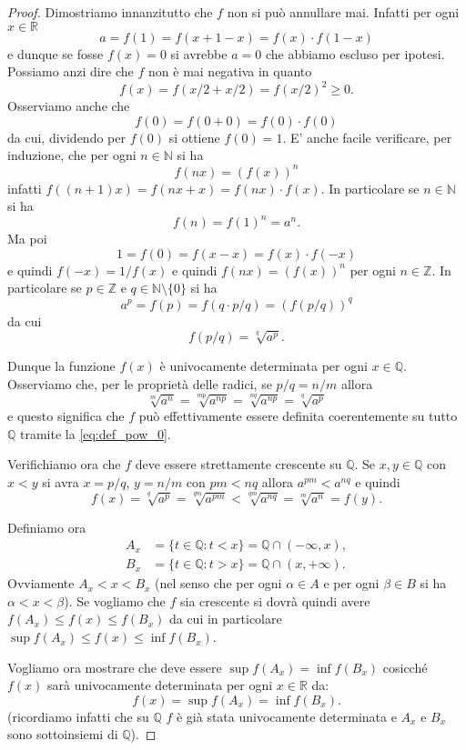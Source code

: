 \documentclass[italian,a4paper,oneside,headinclude]{scrbook}
\newcommand{\NN}{\mathbb N}
\newcommand{\QQ}{\mathbb Q}
\newcommand{\RR}{\mathbb R}
\newcommand{\ZZ}{\mathbb Z}
\begin{document}
\begin{proof}
Dimostriamo innanzitutto che $f$ non si può annullare mai.
Infatti per ogni $x\in \RR$
\[
   a = f(1) = f(x+1-x) = f(x)\cdot f(1-x)
\]
e dunque se fosse $f(x)=0$ si avrebbe $a=0$ che abbiamo escluso per ipotesi.
Possiamo anzi dire che $f$ non è mai negativa in quanto
\[
  f(x) = f(x/2 + x/2) = f(x/2)^2 \ge 0.
\]
Osserviamo anche che
\[
  f(0) = f(0+0) = f(0)\cdot f(0)
\]
da cui, dividendo per $f(0)$ si ottiene $f(0)=1$.
E' anche facile verificare, per induzione, che
per ogni $n\in \NN$ si ha
\[
 f(nx) = (f(x))^n
\]
infatti $f((n+1)x) = f(nx+x)=f(nx)\cdot f(x)$.
In particolare se $n\in \NN$ si ha
\[
  f(n) = f(1)^n = a^n.
\]
Ma poi
\[
1=f(0) = f(x-x) = f(x)\cdot f(-x)
\]
e quindi $f(-x)=1/f(x)$ e quindi $f(nx) = (f(x))^n$ per ogni $n\in \ZZ$.
In particolare se $p\in \ZZ$ e $q \in \NN\setminus\{0\}$ si ha
\[
 a^p = f(p) = f(q\cdot p/q) = (f(p/q))^q
\]
da cui
\begin{equation}\label{eq:def_pow_0}
 f(p/q) = \sqrt[q]{a^p}.
\end{equation}

Dunque la funzione $f(x)$ è univocamente determinata per ogni $x\in \QQ$.
Osserviamo che, per le proprietà delle radici, se $p/q = n/m$ allora
\[
 \sqrt[m]{a^n}
 = \sqrt[mp]{a^{np}}
 = \sqrt[nq]{a^{np}}
 = \sqrt[q]{a^p}
\]
e questo significa che $f$ può effettivamente essere definita
coerentemente su tutto $\QQ$
tramite
la \eqref{eq:def_pow_0}.

Verifichiamo ora che $f$ deve essere strettamente crescente su $\QQ$.
Se $x,y \in \QQ$
con $x<y$ si avra $x=p/q$, $y=n/m$ con $pm < nq$ allora
$a^{pm} < a^{nq}$ e quindi
\[
f(x)
= \sqrt[q]{a^p}
= \sqrt[qm]{a^{pm}}
< \sqrt[qm]{a^{nq}}
= \sqrt[m]{a^n}
= f(y).
\]

Definiamo ora
\begin{align*}
  A_x &= \{t\in \QQ\colon t<x\} = \QQ \cap (-\infty,x),
  \\
  B_x &= \{t\in \QQ\colon t>x\} = \QQ \cap (x,+\infty).
\end{align*}
Ovviamente $A_x < x < B_x$ (nel senso che per ogni $\alpha \in A$
e per ogni $\beta \in B$ si ha $\alpha < x < \beta$).
Se vogliamo che $f$ sia crescente si dovrà quindi avere
$f(A_x) \le f(x) \le f(B_x)$ da cui in particolare
$\sup f(A_x) \le f(x) \le \inf f(B_x)$.

Vogliamo ora mostrare che deve essere
$\sup f(A_x) = \inf f(B_x)$
cosicché $f(x)$ sarà univocamente determinata
per ogni $x\in \RR$ da:
\begin{equation}\label{eq:def_pow_2}
  f(x) = \sup f(A_x) = \inf f(B_x).
\end{equation}
(ricordiamo infatti che su $\QQ$ $f$ è già stata univocamente determinata
e $A_x$ e $B_x$ sono sottoinsiemi di $\QQ$).


\end{proof}
\end{document}

